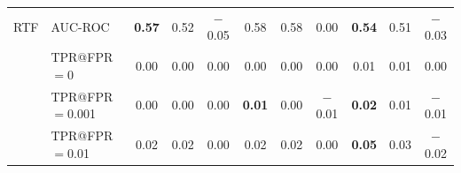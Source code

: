 \begin{table}[t]
\begin{tabular}{llccccccccc}
    \midrule
    \textsc{RTF} & AUC-ROC & \textbf{0.57} & 0.52 & \cellcolor{LossMed}$-$0.05 & 0.58 & 0.58 & 0.00 & \textbf{0.54} & 0.51 & \cellcolor{LossLight}$-$0.03 \\
     & TPR@FPR$=$0 & 0.00 & 0.00 & 0.00 & 0.00 & 0.00 & 0.00 & 0.01 & 0.01 & 0.00 \\
     & TPR@FPR$=$0.001 & 0.00 & 0.00 & 0.00 & \textbf{0.01} & 0.00 & \cellcolor{LossLight}$-$0.01 & \textbf{0.02} & 0.01 & \cellcolor{LossLight}$-$0.01 \\
     & TPR@FPR$=$0.01 & 0.02 & 0.02 & 0.00 & 0.02 & 0.02 & 0.00 & \textbf{0.05} & 0.03 & \cellcolor{LossLight}$-$0.02 \\
    \bottomrule
  \end{tabular}
\end{table}
